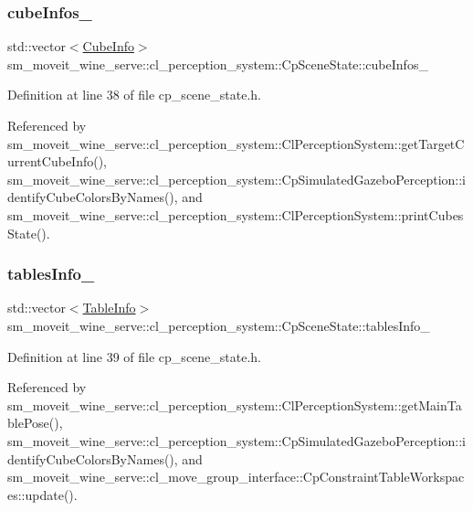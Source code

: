 \subsubsection{\texorpdfstring{cube\+Infos\+\_\+}{cubeInfos\_}}
{\footnotesize\ttfamily std\+::vector$<$\hyperlink{structsm__moveit__wine__serve_1_1cl__perception__system_1_1CubeInfo}{Cube\+Info}$>$ sm\+\_\+moveit\+\_\+wine\+\_\+serve\+::cl\+\_\+perception\+\_\+system\+::\+Cp\+Scene\+State\+::cube\+Infos\+\_\+}



Definition at line 38 of file cp\+\_\+scene\+\_\+state.\+h.



Referenced by sm\+\_\+moveit\+\_\+wine\+\_\+serve\+::cl\+\_\+perception\+\_\+system\+::\+Cl\+Perception\+System\+::get\+Target\+Current\+Cube\+Info(), sm\+\_\+moveit\+\_\+wine\+\_\+serve\+::cl\+\_\+perception\+\_\+system\+::\+Cp\+Simulated\+Gazebo\+Perception\+::identify\+Cube\+Colors\+By\+Names(), and sm\+\_\+moveit\+\_\+wine\+\_\+serve\+::cl\+\_\+perception\+\_\+system\+::\+Cl\+Perception\+System\+::print\+Cubes\+State().

\mbox{\label{classsm__moveit__wine__serve_1_1cl__perception__system_1_1CpSceneState_aa6aea93bb143d2def50c97ec6b55e4cf}} 
\subsubsection{\texorpdfstring{tables\+Info\+\_\+}{tablesInfo\_}}
{\footnotesize\ttfamily std\+::vector$<$\hyperlink{structsm__moveit__wine__serve_1_1cl__perception__system_1_1TableInfo}{Table\+Info}$>$ sm\+\_\+moveit\+\_\+wine\+\_\+serve\+::cl\+\_\+perception\+\_\+system\+::\+Cp\+Scene\+State\+::tables\+Info\+\_\+}



Definition at line 39 of file cp\+\_\+scene\+\_\+state.\+h.



Referenced by sm\+\_\+moveit\+\_\+wine\+\_\+serve\+::cl\+\_\+perception\+\_\+system\+::\+Cl\+Perception\+System\+::get\+Main\+Table\+Pose(), sm\+\_\+moveit\+\_\+wine\+\_\+serve\+::cl\+\_\+perception\+\_\+system\+::\+Cp\+Simulated\+Gazebo\+Perception\+::identify\+Cube\+Colors\+By\+Names(), and sm\+\_\+moveit\+\_\+wine\+\_\+serve\+::cl\+\_\+move\+\_\+group\+\_\+interface\+::\+Cp\+Constraint\+Table\+Workspaces\+::update().



